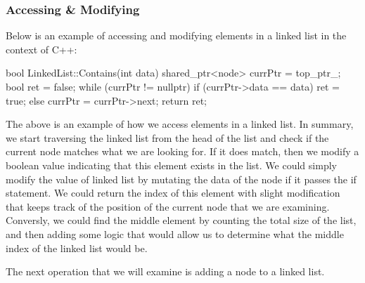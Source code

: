 \begin{highlight}

\subsubsection*{Accessing \& Modifying}

Below is an example of accessing and modifying elements in a linked list in the context of C++:

\begin{code}
bool LinkedList::Contains(int data){
    shared_ptr<node> currPtr = top_ptr_;
    bool ret = false;
    while (currPtr != nullptr) {
        if (currPtr->data == data) {
            ret = true;
        }
        else {}
        currPtr = currPtr->next;
    }
    return ret;
}
\end{code}

The above is an example of how we access elements in a linked list. In summary, we start traversing the linked list from the head of the list and check if the current node matches what we are looking
for. If it does match, then we modify a boolean value indicating that this element exists in the list. We could simply modify the value of linked list by mutating the data of the node if it passes the
if statement. We could return the index of this element with slight modification that keeps track of the position of the current node that we are examining. Conversly, we could find the middle element
by counting the total size of the list, and then adding some logic that would allow us to determine what the middle index of the linked list would be.

\end{highlight}

The next operation that we will examine is adding a node to a linked list.

